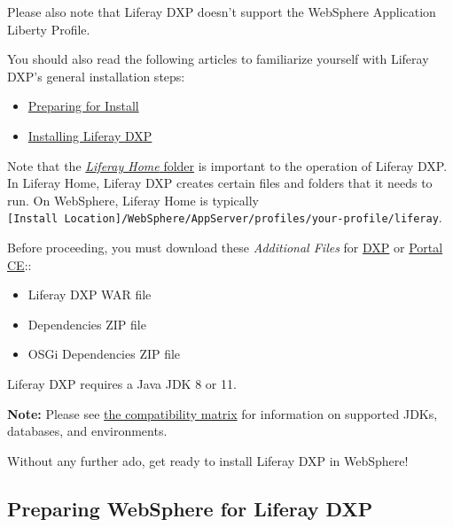 Please also note that Liferay DXP doesn't support the WebSphere
Application Liberty Profile.

You should also read the following articles to familiarize yourself with
Liferay DXP's general installation steps:

\begin{itemize}
\tightlist
\item
  \href{/docs/7-1/deploy/-/knowledge_base/d/preparing-for-install}{Preparing
  for Install}
\item
  \href{/docs/7-1/deploy/-/knowledge_base/d/installing-liferay}{Installing
  Liferay DXP}
\end{itemize}

Note that the
\href{/docs/7-1/deploy/-/knowledge_base/d/installing-liferay\#liferay-home}{\emph{Liferay
Home} folder} is important to the operation of Liferay DXP. In Liferay
Home, Liferay DXP creates certain files and folders that it needs to
run. On WebSphere, Liferay Home is typically
\texttt{{[}Install\ Location{]}/WebSphere/AppServer/profiles/your-profile/liferay}.

Before proceeding, you must download these \emph{Additional Files} for
\href{https://help.liferay.com/hc}{DXP} or
\href{https://www.liferay.com/downloads-community}{Portal CE}::

\begin{itemize}
\tightlist
\item
  Liferay DXP WAR file
\item
  Dependencies ZIP file
\item
  OSGi Dependencies ZIP file
\end{itemize}

Liferay DXP requires a Java JDK 8 or 11.

\noindent\hrulefill

\textbf{Note:} Please see
\href{https://www.liferay.com/documents/10182/246659966/Liferay+DXP+7.1+Compatibility+Matrix.pdf/c8805b72-c693-1f26-3f2d-731ffc301366}{the
compatibility matrix} for information on supported JDKs, databases, and
environments.

\noindent\hrulefill

Without any further ado, get ready to install Liferay DXP in WebSphere!

\subsection{Preparing WebSphere for Liferay
DXP}\label{preparing-websphere-for-liferay-dxp}

